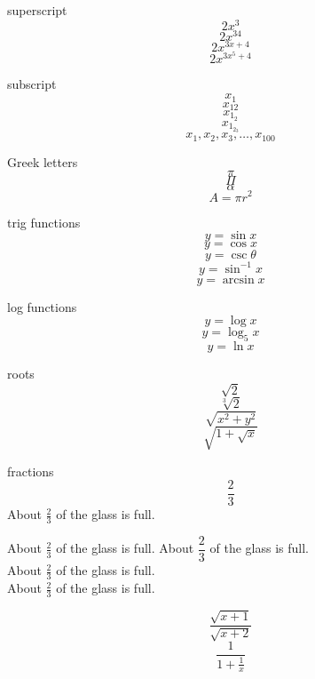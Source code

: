 \documentclass[11pt]{article}
\begin{document}
superscript $$2x^3$$
$$2x^{34}$$
$$2x^{3x+4}$$
$$2x^{3x^5+4}$$

subscript 
$$x_1$$
$$x_{12}$$
$$x_{1_2}$$
$$x_{1_{2_3}}$$
$$x_1,x_2,x_3,\ldots,x_{100}$$

Greek letters
$$\pi$$
$$\Pi$$
$$\alpha$$
$$A=\pi r^2$$

trig functions
$$y=\sin x$$
$$y=\cos x$$
$$y=\csc \theta$$
$$y=\sin^{-1} x$$
$$y=\arcsin x$$

log functions
$$y=\log x$$
$$y=\log_5 x$$
$$y=\ln x$$

roots
$$\sqrt{2}$$
$$\sqrt[3]{2}$$
$$\sqrt{x^2+y^2}$$
$$\sqrt{1+\sqrt{x}}$$

fractions
$$\frac{2}{3}$$
About $\frac{2}{3}$ of the glass is full.

About $\displaystyle \frac{2}{3}$ of the glass is full.
About $\dfrac{2}{3}$ of the glass is full.\\
About $\frac{2}{3}$ of the glass is full.\\[16pt]
About $\displaystyle \frac{2}{3}$ of the glass is full.

$$\frac{\sqrt{x+1}}{\sqrt{x+2}}$$
$$\frac{1}{     1+\frac{1}{x}	}$$
\end{document}
